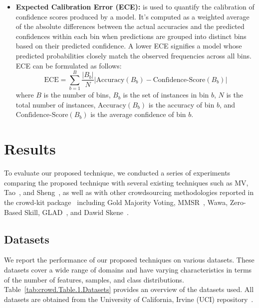 \begin{itemize}
    \item \textbf{Expected Calibration Error (ECE):}  is used to quantify the calibration of  confidence scores produced by a model. It's computed as a weighted average of the absolute differences between the actual accuracies and the predicted confidences within each bin when predictions are grouped into distinct bins based on their predicted confidence. A lower ECE signifies a model whose predicted probabilities closely match the observed frequencies across all bins. ECE can be formulated as follows:
    \begin{equation}
        \text{ECE} = \sum_{b=1}^{B} \frac{ \vert B_b \vert }{N} \left\vert {\text{Accuracy} ( B_{b} ) - \text{Confidence-Score}(B_b)} \right\vert
    \end{equation}
    where $B$ is the number of bins, $B_b$ is the set of instances in bin $b$, $N$ is the total number of instances, $\text{Accuracy} (B_b)$ is the accuracy of bin $b$, and $\text{Confidence-Score} (B_b)$ is the average confidence of bin $b$.
\end{itemize}
%

\section{Results}\label{sec:crowd.results}
To evaluate our proposed technique, we conducted a series of experiments comparing the proposed technique with several existing techniques such as MV, Tao~\cite{tao_Label_2020}, and Sheng~\cite{sheng_Majority_2019}, as well as with other crowdsourcing methodologies reported in the crowd-kit package~\cite{ustalov_learning_2021} including Gold Majority Voting, MMSR~\cite{ma_Adversarial_2020}, Wawa, Zero-Based Skill, GLAD~\cite{whitehill_Whose_2009}, and Dawid Skene~\cite{dawid_Maximum_1979}.

\subsection{Datasets}\label{subsec:results.datasets}
We report the performance of our proposed techniques on various datasets. These datasets cover a wide range of domains and have varying characteristics in terms of the number of features, samples, and class distributions. Table~\ref{tab:crowd.Table.1.Datasets} provides an overview of the datasets used. All datasets are obtained from the University of California, Irvine (UCI) repository~\cite{duan_UCI_2017}.

